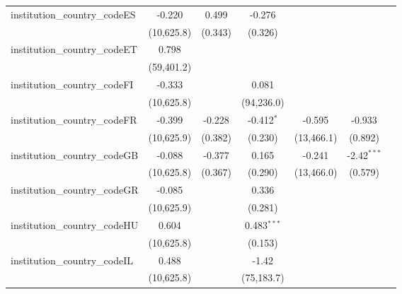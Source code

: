 \begin{tabular}{lcccccc}
   institution\_country\_codeES          & -0.220        & 0.499         & -0.276        &             &               &   \\   
                                         & (10,625.8)    & (0.343)       & (0.326)       &             &               &   \\   
   institution\_country\_codeET          & 0.798         &               &               &             &               &   \\   
                                         & (59,401.2)    &               &               &             &               &   \\   
   institution\_country\_codeFI          & -0.333        &               & 0.081         &             &               &   \\   
                                         & (10,625.8)    &               & (94,236.0)    &             &               &   \\   
   institution\_country\_codeFR          & -0.399        & -0.228        & -0.412$^{*}$  & -0.595      & -0.933        &   \\   
                                         & (10,625.9)    & (0.382)       & (0.230)       & (13,466.1)  & (0.892)       &   \\   
   institution\_country\_codeGB          & -0.088        & -0.377        & 0.165         & -0.241      & -2.42$^{***}$ &   \\   
                                         & (10,625.8)    & (0.367)       & (0.290)       & (13,466.0)  & (0.579)       &   \\   
   institution\_country\_codeGR          & -0.085        &               & 0.336         &             &               &   \\   
                                         & (10,625.9)    &               & (0.281)       &             &               &   \\   
   institution\_country\_codeHU          & 0.604         &               & 0.483$^{***}$ &             &               &   \\   
                                         & (10,625.8)    &               & (0.153)       &             &               &   \\   
   institution\_country\_codeIL          & 0.488         &               & -1.42         &             &               &   \\   
                                         & (10,625.8)    &               & (75,183.7)    &             &               &   \\   

\end{tabular}

